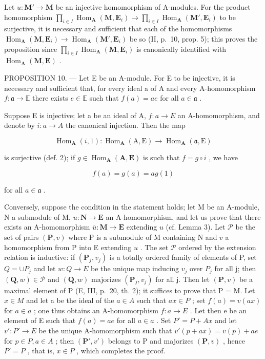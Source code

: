Let \(u: \mathbf{M}' \to \mathbf{M}\) be an injective homomorphism of A-modules. For the product homomorphism \(\prod_{i \in I} \operatorname{Hom}_{\mathbf{A}}(\mathbf{M}, \mathbf{E}_i) \to \prod_{i \in I} \operatorname{Hom}_{\mathbf{A}}(\mathbf{M}', \mathbf{E}_i)\) to be surjective, it is necessary and sufficient that each of the homomorphisms \(\operatorname{Hom}_{\mathbf{A}}(\mathbf{M}, \mathbf{E}_i) \to \operatorname{Hom}_{\mathbf{A}}(\mathbf{M}', \mathbf{E}_i)\) be so (II, p.~10, prop. 5); this proves the proposition since \(\prod_{i \in I} \operatorname{Hom}_{\mathbf{A}}(\mathbf{M}, \mathbf{E}_i)\) is canonically identified with \(\operatorname{Hom}_{\mathbf{A}}(\mathbf{M}, \mathbf{E})\) .

PROPOSITION 10. --- Let E be an A-module. For E to be injective, it is necessary and sufficient that, for every ideal a of A and every A-homomorphism \(f: \mathfrak{a} \to \mathbb{E}\) there exists \(e \in \mathbb{E}\) such that \(f(a) = ae\) for all \(a \in \mathfrak{a}\) .

Suppose E is injective; let a be an ideal of A, \(f : a \to E\) an A-homomorphism, and denote by \(i : a \to A\) the canonical injection. Then the map

\[
\operatorname{Hom} _ {\mathbf {A}} (i, 1): \operatorname{Hom} _ {\mathbf {A}} (\mathrm{A}, \mathrm{E}) \rightarrow \operatorname{Hom} _ {\mathbf {A}} (\mathfrak {a}, \mathrm{E})
\]

is surjective (def. 2); if \(g \in \operatorname{Hom}_{\mathbf{A}}(\mathbf{A}, \mathbf{E})\) is such that \(f = g \circ i\) , we have

\[
f (a) = g (a) = a g (1)
\]

for all \(a \in \mathfrak{a}\) .

Conversely, suppose the condition in the statement holds; let M be an A-module, N a submodule of M, \(u: \mathbf{N} \to \mathbf{E}\) an A-homomorphism, and let us prove that there exists an A-homomorphism \(\overline{u}: \mathbf{M} \to \mathbf{E}\) extending \(u\) (cf. Lemma 3). Let \(\mathcal{P}\) be the set of pairs \((\mathbf{P}, v)\) where P is a submodule of M containing N and \(v\) a homomorphism from P into E extending \(u\) . The set \(\mathcal{P}\) ordered by the extension relation is inductive: if \((\mathbf{P}_{j}, v_{j})\) is a totally ordered family of elements of P, set \(Q = \cup P_{j}\) and let \(w : Q \to E\) be the unique map inducing \(v_{j}\) over \(P_{j}\) for all j; then \((\mathbf{Q}, w) \in \mathcal{P}\) and \((\mathbf{Q}, w)\) majorizes \((\mathbf{P}_{j}, v_{j})\) for all j. Then let \((\mathbf{P}, v)\) be a maximal element of P (E, III, p.~20, th. 2); it suffices to prove that P = M. Let \(x \in M\) and let a be the ideal of the \(a \in A\) such that \(ax \in P\) ; set \(f(a) = v(ax)\) for \(a \in a\) ; one thus obtains an A-homomorphism \(f : a \to E\) . Let then e be an element of E such that \(f(a) = ae\) for all \(a \in a\) . Set \(P' = P + Ax\) and let \(v' : P' \to E\) be the unique A-homomorphism such that \(v'(p + ax) = v(p) + ae\) for \(p \in P, a \in A\) ; then \((\mathbf{P}', v')\) belongs to P and majorizes \((\mathbf{P}, v)\) , hence \(P' = P\) , that is, \(x \in P\) , which completes the proof.

